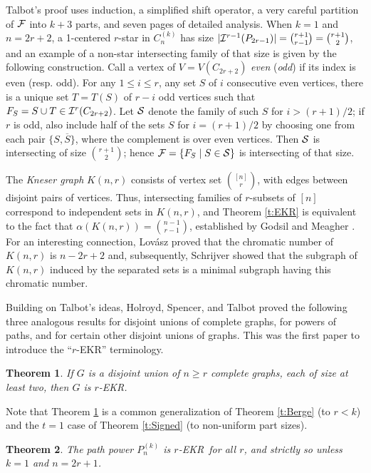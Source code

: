 \documentclass{article}
\newtheorem{thm}{Theorem}%
\def\a{{\alpha}}
\def\cF{{\cal F}}
\def\cI{{\cal I}}
\def\cS{{\cal S}}
\def\oS{{\overline{S}}}
\def\ekr{{\sf EKR}}
\def\knr{{K(n,r)}}
\begin{document}
Talbot's proof uses induction, a simplified shift operator, a very careful partition of $\cF$ into $k+3$ parts, and seven pages of detailed analysis.
When $k=1$ and $n=2r+2$, a 1-centered $r$-star in $C_n^{(k)}$ has size $|\cI^{r-1}(P_{2r-1})|=\binom{r+1}{r-1}=\binom{r+1}{2}$, and an example of a non-star intersecting family of that size is given by the following construction.
Call a vertex of $V=V(C_{2r+2})$ {\it even} ({\it odd}) if its index is even (resp. odd).
For any $1\le i\le r$, any set $S$ of $i$ consecutive even vertices, there is a unique set $T=T(S)$ of $r-i$ odd vertices such that $F_S=S\cup T\in\cI^r(C_{2r+2})$.
Let $\cS$ denote the family of such $S$ for $i>(r+1)/2$; if $r$ is odd, also include half of the sets $S$ for $i=(r+1)/2$ by choosing one from each pair $\{S,\oS\}$, where the complement is over even vertices.
Then $\cS$ is intersecting of size $\binom{r+1}{2}$; hence $\cF=\{F_S\mid S\in\cS\}$ is intersecting of that size.

The {\it Kneser graph} $\knr$ consists of vertex set $\binom{[n]}{r}$, with edges between disjoint pairs of vertices.
Thus, intersecting families of $r$-subsets of $[n]$ correspond to independent sets in $\knr$, and Theorem \ref{t:EKR} is equivalent to the fact that $\a(\knr)=\binom{n-1}{r-1}$, established by Godsil and Meagher \cite{GodsMeag}.
For an interesting connection, Lov\'asz \cite{Lovasz} proved that the chromatic number of $\knr$ is $n-2r+2$ and, subsequently, Schrijver \cite{Schrijver} showed that the subgraph of $\knr$ induced by the separated sets is a minimal subgraph having this chromatic number. 

Building on Talbot's ideas, Holroyd, Spencer, and Talbot \cite{HolSpeTal} proved the following three analogous results for disjoint unions of complete graphs, for powers of paths, and for certain other disjoint unions of graphs.
This was the first paper to introduce the ``$r$-\ekr'' terminology.

\begin{thm}
\label{t:Cliques}
If $G$ is a disjoint union of $n\ge r$ complete graphs, each of size at least two, then $G$ is $r$-\ekr.
\end{thm}

Note that Theorem \ref{t:Cliques} is a common generalization of Theorem \ref{t:Berge} (to $r<k$) and the $t=1$ case of Theorem \ref{t:Signed} (to non-uniform part sizes).

\begin{thm}
\label{t:Paths}
The path power $P_n^{(k)}$ is $r$-\ekr\ for all $r$, and strictly so unless $k=1$ and $n=2r+1$.
\end{thm}
\end{document}
